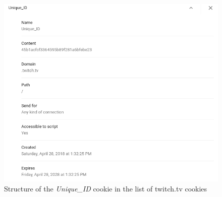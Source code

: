 \begin{figure}[h!]
	\centering
	\includegraphics[width=0.9\linewidth]{sections/figures/twitch_local_cookie_unique_id}
	\caption{Structure of the \textit{Unique\_ID} cookie in the list of twitch.tv cookies}
	\label{fig:twitch-local-cookie-unique-id}
\end{figure}
